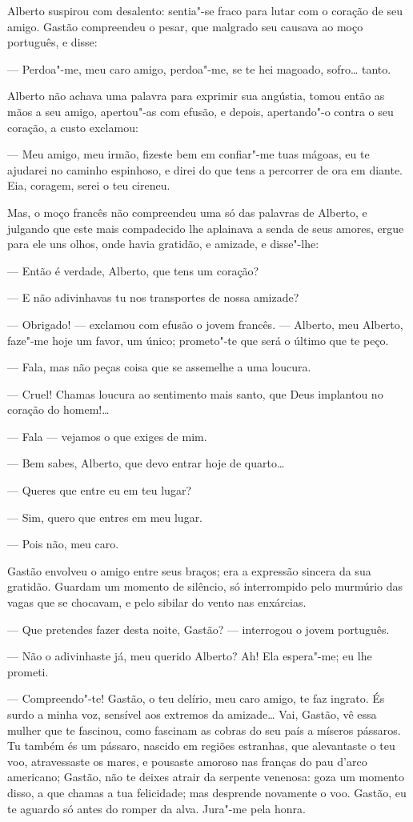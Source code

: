 Alberto suspirou com desalento: sentia"-se fraco para lutar com o coração
de seu amigo. Gastão compreendeu o pesar, que malgrado seu causava ao
moço português, e disse:

--- Perdoa"-me, meu caro amigo, perdoa"-me, se te hei magoado, sofro\ldots{}
tanto.

Alberto não achava uma palavra para exprimir sua angústia, tomou então
as mãos a seu amigo, apertou"-as com efusão, e depois, apertando"-o contra
o seu coração, a custo exclamou:

--- Meu amigo, meu irmão, fizeste bem em confiar"-me tuas mágoas, eu te
ajudarei no caminho espinhoso, e direi do que tens a percorrer de ora em
diante. Eia, coragem, serei o teu cireneu.

Mas, o moço francês não compreendeu uma só das palavras de Alberto, e
julgando que este mais compadecido lhe aplainava a senda de seus amores,
ergue para ele uns olhos, onde havia gratidão, e amizade, e disse"-lhe:

--- Então é verdade, Alberto, que tens um coração?

--- E não adivinhavas tu nos transportes de nossa amizade?

--- Obrigado! --- exclamou com efusão o jovem francês. --- Alberto, meu
Alberto, faze"-me hoje um favor, um único; prometo"-te que será o último
que te peço.

--- Fala, mas não peças coisa que se assemelhe a uma loucura.

--- Cruel! Chamas loucura ao sentimento mais santo, que Deus implantou
no coração do homem!\ldots{}

--- Fala --- vejamos o que exiges de mim.

--- Bem sabes, Alberto, que devo entrar hoje de quarto\ldots{}

--- Queres que entre eu em teu lugar?

--- Sim, quero que entres em meu lugar.

--- Pois não, meu caro.

Gastão envolveu o amigo entre seus braços; era a expressão sincera da
sua gratidão. Guardam um momento de silêncio, só interrompido pelo
murmúrio das vagas que se chocavam, e pelo sibilar do vento nas
enxárcias.

--- Que pretendes fazer desta noite, Gastão? --- interrogou o jovem
português.

--- Não o adivinhaste já, meu querido Alberto? Ah! Ela espera"-me; eu lhe
prometi.

--- Compreendo"-te! Gastão, o teu delírio, meu caro amigo, te faz
ingrato. És surdo a minha voz, sensível aos extremos da amizade\ldots{} Vai,
Gastão, vê essa mulher que te fascinou, como fascinam as cobras do seu
país a míseros pássaros. Tu também és um pássaro, nascido em regiões
estranhas, que alevantaste o teu voo, atravessaste os mares, e pousaste
amoroso nas franças do pau d'arco americano; Gastão, não te deixes
atrair da serpente venenosa: goza um momento disso, a que chamas a tua
felicidade; mas desprende novamente o voo. Gastão, eu te aguardo só
antes do romper da alva. Jura"-me pela honra.

